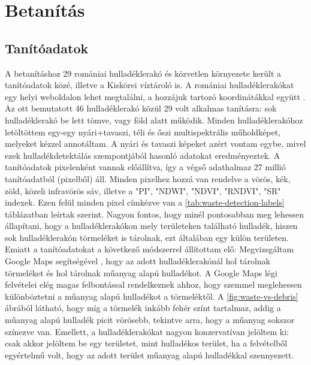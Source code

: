 \chapter{Betanítás}
\label{ch:training}

\section{Tanítóadatok}

A betanításhoz 29 romániai hulladéklerakó és közvetlen környezete került a tanítóadatok közé, illetve a Kiskörei víztároló is. A romániai hulladéklerakókat egy helyi weboldalon lehet megtalálni, a hozzájuk tartozó koordinátákkal együtt \cite{wasteromania2019}. Az ott bemutatott 46 hulladéklerakó közül 29 volt alkalmas tanításra: sok hulladéklerakó be lett tömve, vagy föld alatt működik. Minden hulladéklerakóhoz letöltöttem egy-egy nyári+tavaszi, téli és őszi multispektrális műholdképet, melyeket kézzel annotáltam. A nyári és tavaszi képeket azért vontam egybe, mivel ezek hulladékdetektálás szempontjából hasonló adatokat eredményeztek. A tanítóadatok pixelenként vannak előállítva, így a végső adathalmaz 27 millió tanítóadatból (pixelből) áll. Minden pixelhez hozzá van rendelve a vörös, kék, zöld, közeli infravörös sáv, illetve a "PI", "NDWI", "NDVI", "RNDVI", "SR" indexek. Ezen felül minden pixel címkézve van a \ref{tab:waste-detection-labels} táblázatban leírtak szerint. Nagyon fontos, hogy minél pontosabban meg lehessen állapítani, hogy a hulladéklerakókon mely területeken található hulladék, hiszen sok hulladéklerakón törmeléket is tárolnak, ezt általában egy külön területen. Emiatt a tanítóadatokat a következő módszerrel állítottam elő: Megvizsgáltam Google Maps segítségével \cite{googlemaps2024}, hogy az adott hulladéklerakónál hol tárolnak törmeléket és hol tárolnak műanyag alapú hulladékot. A Google Maps légi felvételei elég magas felbontással rendelkeznek ahhoz, hogy szemmel meglehessen különböztetni a műanyag alapú hulladékot a törmeléktől. A \ref{fig:waste-vs-debris} ábrából látható, hogy míg a törmelék inkább fehér színt tartalmaz, addig a műanyag alapú hulladék picit vörösebb, tekintve arra, hogy a műanyag sokszor színezve van. Emellett, a hulladéklerakókat nagyon konzervatívan jelöltem ki: csak akkor jelöltem be egy területet, mint hulladékos terület, ha a felvételből egyértelmű volt, hogy az adott terület műanyag alapú hulladékkal szennyezett.

